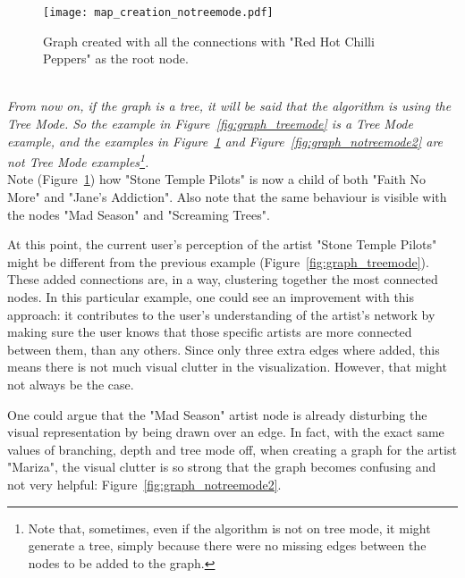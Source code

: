       \begin{figure}[ht]
        \begin{center}
          \texttt{[image: map\_creation\_notreemode.pdf]}
        \end{center}
        \caption{Graph created with all the connections with "Red Hot Chilli Peppers" as the root node.}
        \label{fig:graph_notreemode}
      \end{figure}

      \hfill \\
      \indent \emph{
      From now on, if the graph is a tree, it will be said that the algorithm is using the \emph{Tree Mode}.
      So the example in Figure~\ref{fig:graph_treemode} is a \emph{Tree Mode} example, and the examples in Figure~\ref{fig:graph_notreemode} and Figure~\ref{fig:graph_notreemode2} are not \emph{Tree Mode} examples\footnote{
        Note that, sometimes, even if the algorithm is not on tree mode, it might generate a tree, simply because there were no missing edges between the nodes to be added to the graph.
      }.}
      \hfill \\

      Note (Figure~\ref{fig:graph_notreemode}) how "Stone Temple Pilots" is now a child of both "Faith No More" and "Jane's Addiction".
      Also note that the same behaviour is visible with the nodes "Mad Season" and "Screaming Trees".

      At this point, the current user's perception of the artist "Stone Temple Pilots" might be different from the previous example (Figure~\ref{fig:graph_treemode}).
      These added connections are, in a way, clustering together the most connected nodes.
      In this particular example, one could see an improvement with this approach: it contributes to the user's understanding of the artist's network by making sure the user knows that those specific artists are more connected between them, than any others.
      Since only three extra edges where added, this means there is not much visual clutter in the visualization.
      However, that might not always be the case.

      One could argue that the "Mad Season" artist node is already disturbing the visual representation by being drawn over an edge.
      In fact, with the exact same values of branching, depth and tree mode off, when creating a graph for the artist "Mariza", the visual clutter is so strong that the graph becomes confusing and not very helpful: Figure~\ref{fig:graph_notreemode2}.

